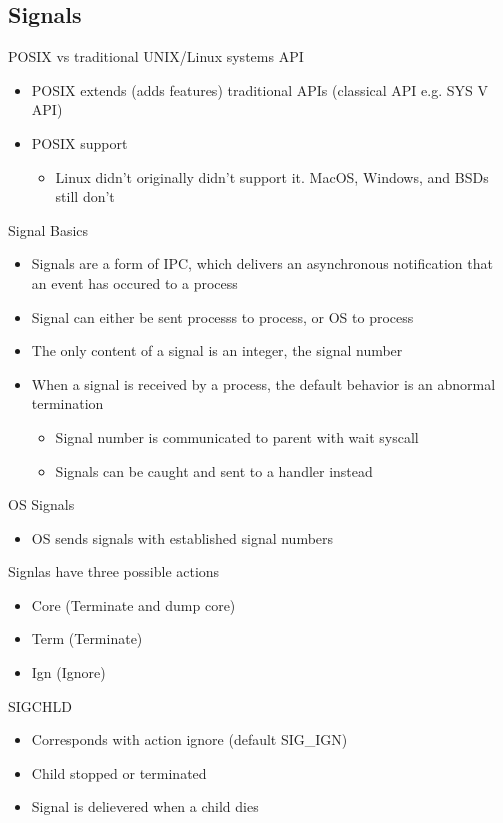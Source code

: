 \subsection{Signals}
POSIX vs traditional UNIX/Linux systems API
\begin{itemize}
    \item POSIX extends (adds features) traditional APIs (classical API e.g. SYS V API)
    \item POSIX support
    \begin{itemize}
        \item Linux didn't originally didn't support it. MacOS, Windows, and BSDs still don't
    \end{itemize}
\end{itemize}
Signal Basics
\begin{itemize}
    \item Signals are a form of IPC, which delivers an asynchronous notification that an event has occured to a process
    \item Signal can either be sent processs to process, or OS to process
    \item The only content of a signal is an integer, the signal number
    \item When a signal is received by a process, the default behavior is an abnormal termination
    \begin{itemize}
        \item Signal number is communicated to parent with wait syscall
        \item Signals can be caught and sent to a handler instead
    \end{itemize}
\end{itemize}
OS Signals
\begin{itemize}
    \item OS sends signals with established signal numbers
\end{itemize}
Signlas have three possible actions
\begin{itemize}
    \item Core (Terminate and dump core)
    \item Term (Terminate)
    \item Ign (Ignore)
\end{itemize}
SIGCHLD
\begin{itemize}
    \item Corresponds with action ignore (default SIG\_IGN)
    \item Child stopped or terminated
    \item Signal is delievered when a child dies
\end{itemize}
